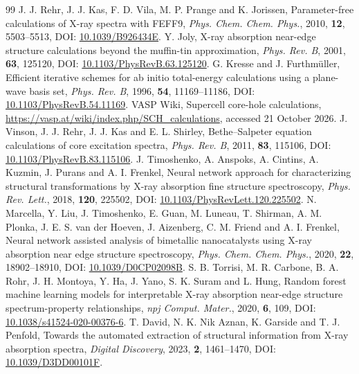 \begin{thebibliography}{99}
 J. J. Rehr, J. J. Kas, F. D. Vila, M. P. Prange and K. Jorissen, Parameter-free calculations of X-ray spectra with FEFF9, \textit{Phys. Chem. Chem. Phys.}, 2010, \textbf{12}, 5503--5513, DOI: \href{https://doi.org/10.1039/B926434E}{10.1039/B926434E}.
 Y. Joly, X-ray absorption near-edge structure calculations beyond the muffin-tin approximation, \textit{Phys. Rev. B}, 2001, \textbf{63}, 125120, DOI: \href{https://doi.org/10.1103/PhysRevB.63.125120}{10.1103/PhysRevB.63.125120}.
 G. Kresse and J. Furthm\"uller, Efficient iterative schemes for ab initio total-energy calculations using a plane-wave basis set, \textit{Phys. Rev. B}, 1996, \textbf{54}, 11169--11186, DOI: \href{https://doi.org/10.1103/PhysRevB.54.11169}{10.1103/PhysRevB.54.11169}.
 VASP Wiki, Supercell core-hole calculations, \url{https://vasp.at/wiki/index.php/SCH_calculations}, accessed 21 October 2026.
 J. Vinson, J. J. Rehr, J. J. Kas and E. L. Shirley, Bethe--Salpeter equation calculations of core excitation spectra, \textit{Phys. Rev. B}, 2011, \textbf{83}, 115106, DOI: \href{https://doi.org/10.1103/PhysRevB.83.115106}{10.1103/PhysRevB.83.115106}.
 J. Timoshenko, A. Anspoks, A. Cintins, A. Kuzmin, J. Purans and A. I. Frenkel, Neural network approach for characterizing structural transformations by X-ray absorption fine structure spectroscopy, \textit{Phys. Rev. Lett.}, 2018, \textbf{120}, 225502, DOI: \href{https://doi.org/10.1103/PhysRevLett.120.225502}{10.1103/PhysRevLett.120.225502}.
 N. Marcella, Y. Liu, J. Timoshenko, E. Guan, M. Luneau, T. Shirman, A. M. Plonka, J. E. S. van der Hoeven, J. Aizenberg, C. M. Friend and A. I. Frenkel, Neural network assisted analysis of bimetallic nanocatalysts using X-ray absorption near edge structure spectroscopy, \textit{Phys. Chem. Chem. Phys.}, 2020, \textbf{22}, 18902--18910, DOI: \href{https://doi.org/10.1039/D0CP02098B}{10.1039/D0CP02098B}.
 S. B. Torrisi, M. R. Carbone, B. A. Rohr, J. H. Montoya, Y. Ha, J. Yano, S. K. Suram and L. Hung, Random forest machine learning models for interpretable X-ray absorption near-edge structure spectrum-property relationships, \textit{npj Comput. Mater.}, 2020, \textbf{6}, 109, DOI: \href{https://doi.org/10.1038/s41524-020-00376-6}{10.1038/s41524-020-00376-6}.
 T. David, N. K. Nik Aznan, K. Garside and T. J. Penfold, Towards the automated extraction of structural information from X-ray absorption spectra, \textit{Digital Discovery}, 2023, \textbf{2}, 1461--1470, DOI: \href{https://doi.org/10.1039/D3DD00101F}{10.1039/D3DD00101F}.

\end{thebibliography}
